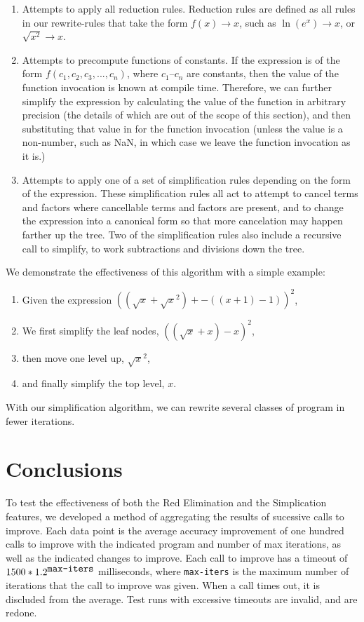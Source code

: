 \documentclass{article}
\newcommand{\lnexp}[1]{\ln{\left(e^{#1}\right)}}
\newcommand{\sqrsqrt}[1]{\sqrt{#1}^2}
\begin{document}
\begin{enumerate}
\item Attempts to apply all reduction rules. 
Reduction rules are defined as all rules 
in our rewrite-rules 
that take the form $f(x) \to x$, 
such as $\lnexp{x} \to x$, 
or $\sqrt{x^2} \to x$.

\item Attempts to precompute functions of constants. 
If the expression 
is of the form $f(c_1, c_2, c_3,..., c_n)$, 
where $c_1$--$c_n$ are constants, 
then the value of the function invocation 
is known at compile time. 
Therefore, we can further simplify the expression 
by calculating the value of the function 
in arbitrary precision 
(the details of which are out of the scope of this section), 
and then substituting that value 
in for the function invocation 
(unless the value is a non-number, 
such as NaN, 
in which case we leave the function invocation 
as it is.)

\item Attempts to apply one 
of a set of simplification rules 
depending on the form of the expression. 
These simplification rules 
all act to attempt to cancel terms and factors 
where cancellable terms and factors are present, 
and to change the expression into a canonical form 
so that more cancelation may happen 
farther up the tree. 
Two of the simplification rules 
also include a recursive call to simplify, 
to work subtractions and divisions down the tree.
\end{enumerate}

We demonstrate the effectiveness of this algorithm 
with a simple example:

\begin{enumerate}
\item Given the expression
$((\sqrt{x} + \sqrsqrt{x}) + -((x + 1) - 1))^2$,
\item We first simplify the leaf nodes,
$((\sqrt{x} + x) -x)^2$,
\item then move one level up, 
$\sqrt{x}^2$,
\item and finally simplify the top level,
$x$.
\end{enumerate}

With our simplification algorithm, 
we can rewrite several classes of program
in fewer iterations.

\section{Conclusions}
To test the effectiveness 
of both the Red Elimination 
and the Simplication features,
we developed a method of aggregating
the results of sucessive calls to improve.
Each data point is the average accuracy improvement
of one hundred calls to improve
with the indicated program
and number of max iterations,
as well as the indicated changes to improve.
Each call to improve has a timeout of 
$1500*1.2^{\verb|max-iters|}$ milliseconds,
where \verb|max-iters| is the maximum number of iterations
that the call to improve was given.
When a call times out,
it is discluded from the average.
Test runs with excessive timeouts are invalid,
and are redone.
\end{document}
